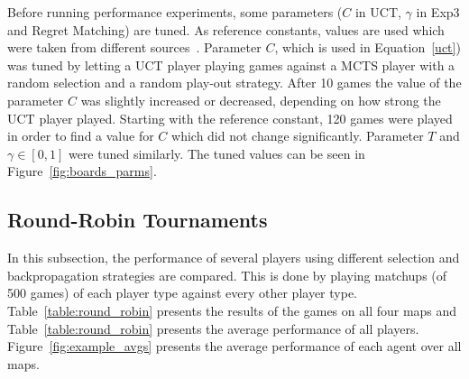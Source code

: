\documentclass{article}
\begin{document}

Before running performance experiments, some parameters ($C$ in UCT, $\gamma$ in Exp3 and Regret Matching) are tuned. 
As reference constants, values are used which were taken from different sources~\cite{teuling_tron,cig_paper}. Parameter $C$, which is used in Equation~\ref{uct}) was tuned by letting a UCT player playing games against a MCTS player with a random selection and a random play-out strategy. 
After 10 games the value of the parameter $C$ was slightly increased or decreased, depending on how strong the UCT player played. 
Starting with the reference constant, 120 games were played in order to find a value for $C$ which did not change significantly.
Parameter $T$ and $\gamma \in [0,1]$ were tuned similarly.
The tuned values can be seen in Figure~\ref{fig:boards_parms}.

\subsection{Round-Robin Tournaments}
\label{subsec:round_robin}

In this subsection, the performance of several players using different selection and backpropagation strategies are compared. 
This is done by playing matchups (of 500 games) of each player type against every other player type. 
Table~\ref{table:round_robin} presents the results of the games on all four maps and Table~\ref{table:round_robin} presents the average
performance of all players.
Figure~\ref{fig:example_avgs} presents the average performance of each agent over all maps. 
\end{document}
